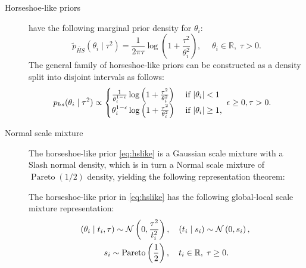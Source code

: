 \documentclass[11pt]{article}
\begin{document}
\begin{description}
  \item[Horseshoe-like priors] 
    \citet{bhadra2017horseshoe} have the following marginal prior density for
    $\theta_i$: 
    \begin{equation}
      \tilde p_{\tilde{HS}} (\theta_i \mid \tau^2) = \frac{1}{2 \pi{\tau}}\log
      \left ( 1 + \frac{\tau^2}{\theta_i^2} \right ), \quad  \; \theta_i  \in
      \mathbb{R},\; \tau > 0. \label{eq:hslike}
    \end{equation}
    The general family of horseshoe-like priors can be constructed as a density
    split into disjoint intervals as follows:
    \begin{align}
      p_{hs}(\theta_i \mid \tau^2)&  \propto \begin{cases}
        \frac{1}{\theta_i^{1-\epsilon}}\log \left( 1 + \frac{\tau^2}{\theta_i^2}
          \right) & \text{ if } {\lvert\theta_i\rvert < 1} \\ \theta_i^{1-\epsilon}
          \log \left( 1 + \frac{\tau^2}{\theta_i^2} \right) & \text{ if
        }{\lvert\theta_i\rvert \ge 1}, \\ \end{cases} \; \epsilon \ge 0,\tau > 0.
        \label{eq:split} 
    \end{align}
  \item[Normal scale mixture] 
    The horseshoe-like prior \eqref{eq:hslike} is a Gaussian scale mixture with
    a Slash normal density, which is in turn a Normal scale mixture of 
    $\operatorname{Pareto}(1/2)$ density, yielding the following representation
    theorem: 
    \begin{theorem}\label{th:hslike}
      The horseshoe-like prior in \eqref{eq:hslike} has the following global-local
      scale mixture representation:
      \begin{equation}
        \begin{gathered}
          (\theta_i \mid t_i, \tau) 
          \sim {\cal N}\left(0, \frac{\tau^2}{t_i^2} \right)
          ,\quad
          (t_i \mid s_i) 
          \sim {\cal N}\left(0, s_i \right), \; 
          \\
          s_i 
          \sim \operatorname{Pareto}\left( \frac{1}{2} \right), 
          \quad 
          t_i \in \mathbb{R}, \; \tau \ge 0.
        \end{gathered}
        \label{eq:pareto}
      \end{equation}
    \end{theorem}
\end{description}
\end{document}
